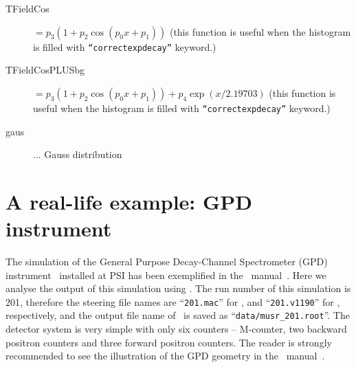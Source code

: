 \documentclass[twoside]{dis04}
\begin{document}
\begin{description}
\begin{description}
       \item[TFieldCos] $=p_3 (1+p_2 \cos(p_0 x + p_1))$  \hspace{1cm} (this function is useful when the histogram is filled with {\tt ``correctexpdecay''} keyword.)
       \item[TFieldCosPLUSbg] $=p_3 (1+p_2 \cos(p_0 x + p_1))  + p_4 \exp(x/2.19703)$
            \hspace{1cm} (this function is useful when the histogram is filled with {\tt ``correctexpdecay''} keyword.)
       \item[gaus] ... Gauss distribution
     \end{description}


\end{description}
\section{A real-life example: GPD instrument}
\label{sec:GPD}
The simulation of the General Purpose Decay-Channel Spectrometer (GPD) 
instrument~\cite{GPD} installed at PSI has been exemplified 
in the \musrSim\ manual~\cite{musrSim}.
Here we analyse the output of this simulation using \musrSimAna.
The run number of this simulation is 201, therefore the steering
file names are ``{\tt 201.mac}'' for \musrSim, and  ``{\tt 201.v1190}'' for
\musrSimAna, respectively, and the output file name of \musrSim\ is saved as
``{\tt data/musr\_201.root}''.
The detector system is very simple with only six counters -- M-counter,
two backward positron counters and three forward positron counters.
The reader is strongly recommended to see the illustration of the GPD
geometry in the \musrSim\ manual~\cite{musrSim}.
\end{document}
